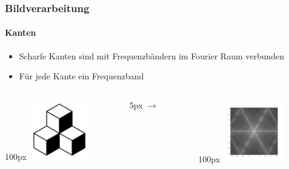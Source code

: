 \begin{frame}
    \frametitle{Bildverarbeitung}
    \framesubtitle{Kanten}
    \begin{itemize}
        \item Scharfe Kanten sind mit Frequenzbändern im Fourier Raum verbunden        
        \item Für jede Kante ein Frequenzband
    \end{itemize}
    \begin{columns}
        \begin{column}{100px}
            \includegraphics[width=100px]{images/04-applications-image-cubes.jpg}
        \end{column}
        \hspace*{-50px}
        \begin{column}{5px}
            $\rightarrow$
        \end{column}
        \hspace*{-50px}
        \begin{column}{100px}
            \includegraphics[width=100px]{images/04-applications-image-cubes-ft.png}
        \end{column}
    \end{columns}
\end{frame}

